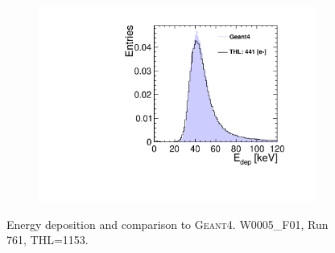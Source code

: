 \begin{figure}[htbp]
\begin{subfigure}[b]{0.32\textwidth}
    \includegraphics[width=\textwidth]{./figures/Calibration/Edep_G4_W0005_F01.pdf}
    \caption{}
  \end{subfigure}
  \caption{Energy deposition and comparison to
    \textsc{Geant4}. W0005\_F01, Run 761, THL=1153.}
  \label{fig:EdepW5F1}
\end{figure}
